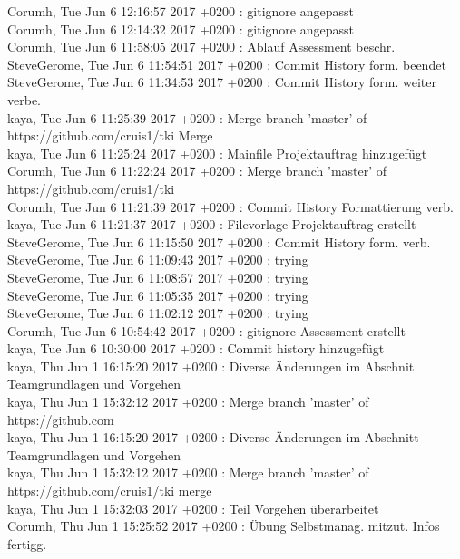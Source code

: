 Corumh, Tue Jun 6 12:16:57 2017 +0200 : gitignore angepasst \\
Corumh, Tue Jun 6 12:14:32 2017 +0200 : gitignore angepasst \\
Corumh, Tue Jun 6 11:58:05 2017 +0200 : Ablauf Assessment beschr. \\
SteveGerome, Tue Jun 6 11:54:51 2017 +0200 : Commit History form. beendet \\
SteveGerome, Tue Jun 6 11:34:53 2017 +0200 : Commit History form. weiter verbe. \\
kaya, Tue Jun 6 11:25:39 2017 +0200 : Merge branch 'master' of https://github.com/cruis1/tki Merge \\
kaya, Tue Jun 6 11:25:24 2017 +0200 : Mainfile Projektauftrag hinzugefügt \\
Corumh, Tue Jun 6 11:22:24 2017 +0200 : Merge branch 'master' of https://github.com/cruis1/tki \\
Corumh, Tue Jun 6 11:21:39 2017 +0200 : Commit History Formattierung verb. \\
kaya, Tue Jun 6 11:21:37 2017 +0200 : Filevorlage Projektauftrag erstellt \\
SteveGerome, Tue Jun 6 11:15:50 2017 +0200 : Commit History form. verb. \\
SteveGerome, Tue Jun 6 11:09:43 2017 +0200 : trying \\
SteveGerome, Tue Jun 6 11:08:57 2017 +0200 : trying \\
SteveGerome, Tue Jun 6 11:05:35 2017 +0200 : trying \\
SteveGerome, Tue Jun 6 11:02:12 2017 +0200 : trying \\
Corumh, Tue Jun 6 10:54:42 2017 +0200 : gitignore Assessment erstellt \\
kaya, Tue Jun 6 10:30:00 2017 +0200 : Commit history hinzugefügt \\
kaya, Thu Jun 1 16:15:20 2017 +0200 : Diverse Änderungen im Abschnit Teamgrundlagen und Vorgehen \\
kaya, Thu Jun 1 15:32:12 2017 +0200 : Merge branch 'master' of https://github.com \\
kaya, Thu Jun 1 16:15:20 2017 +0200 : Diverse Änderungen im Abschnitt Teamgrundlagen und Vorgehen \\
kaya, Thu Jun 1 15:32:12 2017 +0200 : Merge branch 'master' of https://github.com/cruis1/tki merge \\
kaya, Thu Jun 1 15:32:03 2017 +0200 : Teil Vorgehen überarbeitet \\
Corumh, Thu Jun 1 15:25:52 2017 +0200 : Übung Selbstmanag. mitzut. Infos fertigg. \\
